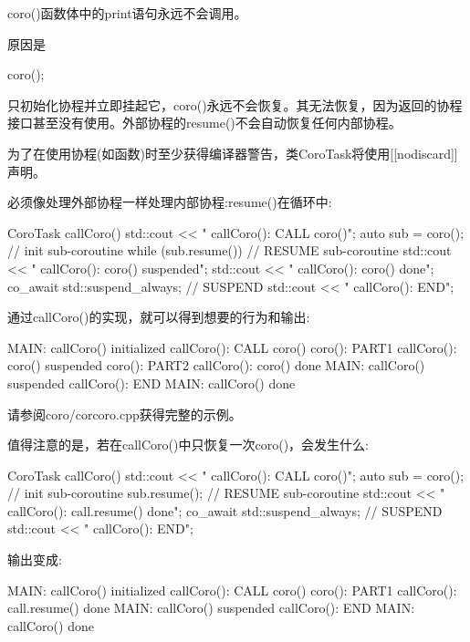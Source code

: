 coro()函数体中的print语句永远不会调用。

原因是

\begin{cpp}
coro();
\end{cpp}

只初始化协程并立即挂起它，coro()永远不会恢复。其无法恢复，因为返回的协程接口甚至没有使用。外部协程的resume()不会自动恢复任何内部协程。

为了在使用协程(如函数)时至少获得编译器警告，类CoroTask将使用[[nodiscard]]声明。


必须像处理外部协程一样处理内部协程:resume()在循环中:

\begin{cpp}
CoroTask callCoro()
{
	std::cout << " callCoro(): CALL coro()\n";
	auto sub = coro(); // init sub-coroutine
	while (sub.resume()) { // RESUME sub-coroutine
		std::cout << " callCoro(): coro() suspended\n";
	}
	std::cout << " callCoro(): coro() done\n";
	co_await std::suspend_always{}; // SUSPEND
	std::cout << " callCoro(): END\n";
}
\end{cpp}

通过callCoro()的实现，就可以得到想要的行为和输出:

\begin{shell}
MAIN: callCoro() initialized
  callCoro(): CALL coro()
    coro(): PART1
  callCoro(): coro() suspended
    coro(): PART2
  callCoro(): coro() done
MAIN: callCoro() suspended
  callCoro(): END
MAIN: callCoro() done
\end{shell}

请参阅coro/corcoro.cpp获得完整的示例。


值得注意的是，若在callCoro()中只恢复一次coro()，会发生什么:

\begin{cpp}
CoroTask callCoro()
{
	std::cout << " callCoro(): CALL coro()\n";
	auto sub = coro(); // init sub-coroutine
	sub.resume(); // RESUME sub-coroutine
	std::cout << " callCoro(): call.resume() done\n";
	co_await std::suspend_always{}; // SUSPEND
	std::cout << " callCoro(): END\n";
}
\end{cpp}

输出变成:

\begin{shell}
MAIN: callCoro() initialized
  callCoro(): CALL coro()
    coro(): PART1
  callCoro(): call.resume() done
MAIN: callCoro() suspended
  callCoro(): END
MAIN: callCoro() done
\end{shell}


